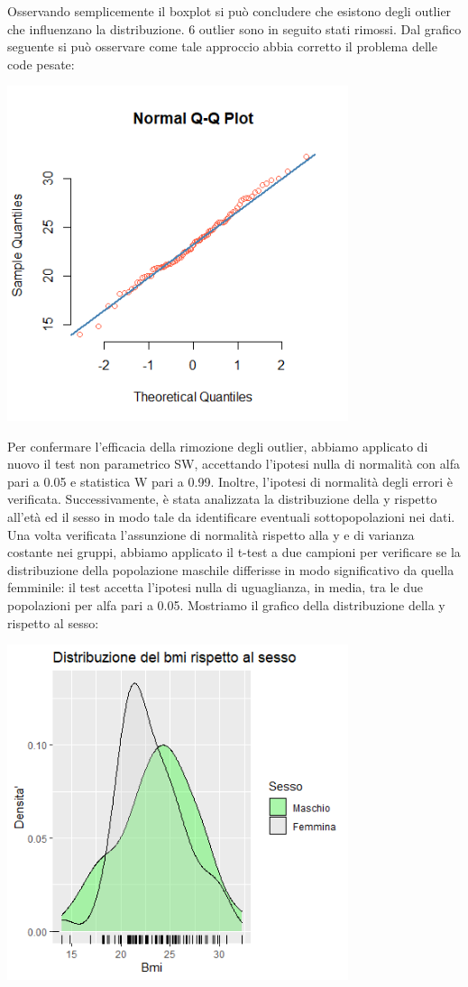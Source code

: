 Osservando semplicemente il boxplot si può concludere che esistono degli outlier che influenzano la distribuzione. 6 outlier sono in seguito stati rimossi. Dal grafico seguente si può osservare come tale approccio abbia corretto il problema delle code pesate:
\begin{Figure}
    \centering
    \includegraphics[width=10cm,keepaspectratio]{images/qqplot_bmi_no_outliers.png}
  \end{Figure}
Per confermare l'efficacia della rimozione degli outlier, abbiamo applicato di nuovo il test non parametrico SW, accettando l’ipotesi nulla di normalità con alfa pari a 0.05 e statistica W pari a 0.99. Inoltre, l’ipotesi di normalità degli errori è verificata.
Successivamente, è stata analizzata la distribuzione della y rispetto all’età ed il sesso in modo tale da identificare eventuali sottopopolazioni nei dati. Una volta verificata l’assunzione di normalità rispetto alla y e di varianza costante nei gruppi, abbiamo applicato il t-test a due campioni per verificare se la distribuzione della popolazione maschile differisse in modo significativo da quella femminile: il test accetta l’ipotesi nulla di uguaglianza, in media, tra le due popolazioni per alfa pari a 0.05. Mostriamo il grafico della distribuzione della y rispetto al sesso: 
\begin{Figure}
    \centering
    \includegraphics[width=10cm,keepaspectratio]{images/distribuzione_sesso_bmi.png}
  \end{Figure}
